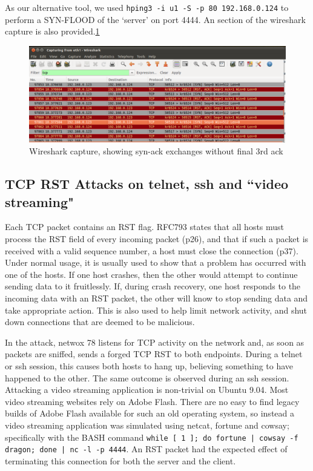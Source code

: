 As our alternative tool, we used {\tt hping3 -i u1 -S -p 80 192.168.0.124} to perform a SYN-FLOOD of the `server' on
port 4444. An section of the wireshark capture is also provided.\ref{fig:ws-rst}

\begin{figure}[h]
    \centering
    \includegraphics[width=.75\linewidth]{images/ws-rst-crop.png}
    \caption{Wireshark capture, showing syn-ack exchanges without final 3rd ack}
    \label{fig:ws-rst}
\end{figure}

\subsection{TCP RST Attacks on telnet, ssh and ``video streaming"}

Each TCP packet contains an RST flag. RFC793\cite{rfc793} states that all hosts must process the RST field of every incoming packet
(p26), and that if such a packet is received with a valid sequence number, a host must close the connection (p37). Under
normal usage, it is usually used to show that a problem has occurred with one of the hosts. If one host crashes, then
the other would attempt to continue sending data to it fruitlessly. If, during crash recovery, one host responds to the
incoming data with an RST packet, the other will know to stop sending data and take appropriate action. This is also
used to help limit network activity, and shut down connections that are deemed to be malicious.

In the attack, netwox 78 listens for TCP activity on the network and, as soon as packets are sniffed, sends a forged TCP
RST to both endpoints. During a telnet or ssh session, this causes both hosts to hang up, believing something to have
happened to the other. The same outcome is observed during an ssh session. Attacking a video streaming application is
non-trivial on Ubuntu 9.04. Most video streaming websites rely on Adobe Flash. There are no easy to find legacy builds
of Adobe Flash available for such an old operating system, so instead a video streaming application was simulated using
netcat, fortune and cowsay; specifically with the BASH command {\tt while [ 1 ]; do fortune | cowsay -f dragon; done |
nc -l -p 4444}. An RST packet had the expected effect of terminating this connection for both the server and the client.

